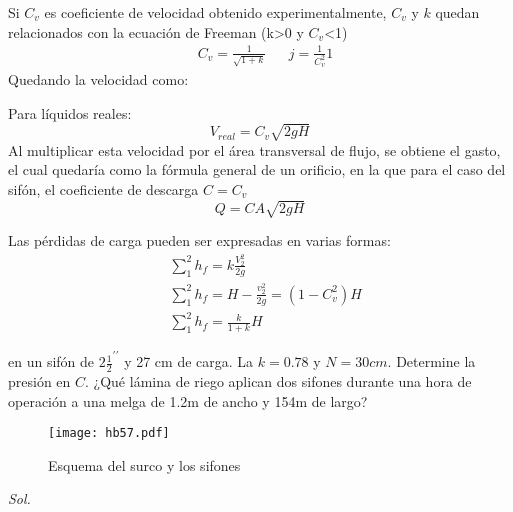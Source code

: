 Si $C_v$ es coeficiente de velocidad obtenido experimentalmente, $C_v$ y $k$ quedan relacionados con la ecuación de Freeman (k>0 y $C_v$<1)
\begin{align*}
    &C_v = \frac{1}{\sqrt{1 + k}}&&j = \frac{1}{C_v^2} 1
\end{align*}
Quedando la velocidad como:
\begin{theorem}
    Para líquidos reales:
    \begin{equation}
        V_{real} = C_v \sqrt{2gH}
    \end{equation}
Al multiplicar esta velocidad por el área transversal de flujo, se obtiene el gasto, el cual quedaría como la fórmula general de un orificio, en la que para el caso del sifón, el coeficiente de descarga $C=C_v$
\begin{equation}
    Q = CA \sqrt{2gH}
\end{equation}
\end{theorem}
Las pérdidas de carga pueden ser expresadas en varias formas:
\begin{align}
    &\sum_1^2 h_f = k \frac{V_2^2}{2g}\\
    &\sum_1^2 h_f = H - \frac{v_2^2}{2g} =\left(1 - C_v^2\right)H\\
    &\sum_1^2 h_f = \frac{k}{1 + k}H   
\end{align}

\begin{problem}
    en un sifón de $2 \frac{1}{2}^{\prime\prime}$ y 27 cm de carga. La $k=0.78$ y $N=30cm$. Determine la presión en $C$. ¿Qué lámina de riego aplican dos sifones durante una hora de operación a una melga de 1.2m de ancho y 154m de largo?
\end{problem}

\begin{figure}[h!]
\centering
  \texttt{[image: hb57.pdf]}
  \caption{Esquema del surco y los sifones}
  \label{hb57}
\end{figure}

\textit{ Sol. }

